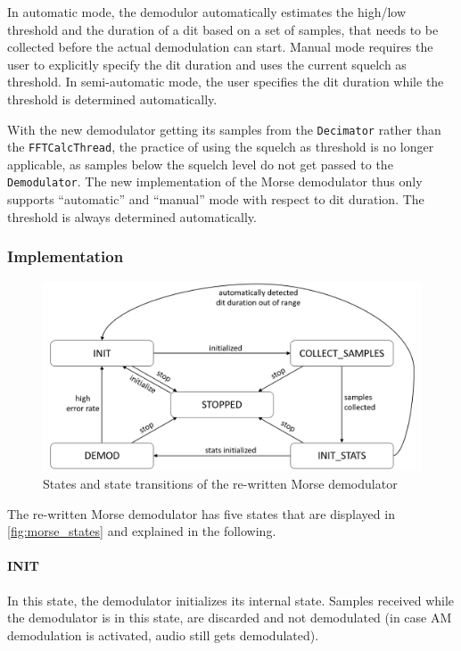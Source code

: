 In automatic mode, the demodulor automatically estimates the high/low threshold and the duration of a dit based on a set of samples, that needs to be collected before the actual demodulation can start. Manual mode requires the user to explicitly specify the dit duration and uses the current squelch as threshold. In semi-automatic mode, the user specifies the dit duration while the threshold is determined automatically.

With the new demodulator getting its samples from the \texttt{Decimator} rather than the \texttt{FFTCalcThread}, the practice of using the squelch as threshold is no longer applicable, as samples below the squelch level do not get passed to the \texttt{Demodulator}. The new implementation of the Morse demodulator thus only supports ``automatic'' and ``manual'' mode with respect to dit duration. The threshold is always determined automatically.


\subsubsection{Implementation}

\begin{figure}
	\centering
	\includegraphics[width=1\linewidth]{gfx/morse_states.png}
	\caption{States and state transitions of the re-written Morse demodulator}
	\label{fig:morse_states}
\end{figure}

The re-written Morse demodulator has five states that are displayed in \autoref{fig:morse_states} and explained in the following.

\paragraph{INIT} In this state, the demodulator initializes its internal state. Samples received while the demodulator is in this state, are discarded and not demodulated (in case \ac{AM} demodulation is activated, audio still gets demodulated).
